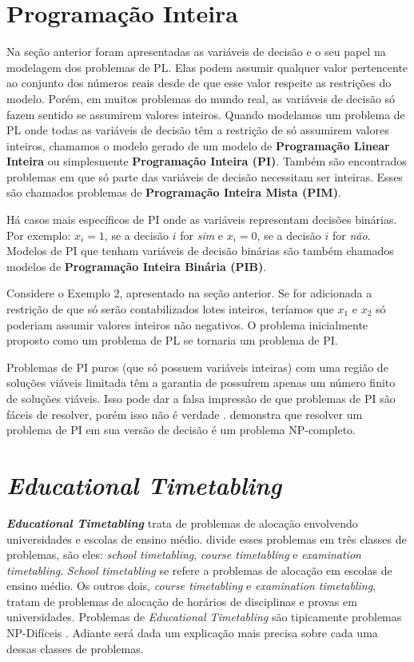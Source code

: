 \section{Programação Inteira}	

Na seção anterior foram apresentadas as variáveis de decisão e o seu papel na modelagem dos problemas de PL. Elas podem assumir qualquer valor pertencente ao conjunto dos números reais desde de que esse valor respeite as restrições do modelo. Porém, em muitos problemas do mundo real, as variáveis de decisão só fazem sentido se assumirem valores inteiros. Quando modelamos um problema de PL onde todas as variáveis de decisão têm a restrição de só assumirem valores inteiros, chamamos o modelo gerado de um modelo de \textbf{Programação Linear Inteira} ou simplesmente \textbf{Programação Inteira (PI)}. Também são encontrados problemas em que só parte das variáveis de decisão necessitam ser inteiras. Esses são chamados problemas de \textbf{Programação Inteira Mista (PIM)}. 

Há casos mais específicos de PI onde as variáveis representam decisões binárias. Por exemplo: $x_i = 1$, se a decisão $i$ for \textit{sim} e $x_i = 0$, se a decisão $i$ for \textit{não}. Modelos de PI que tenham variáveis de decisão binárias são também chamados modelos de \textbf{Programação Inteira Binária (PIB)}.

Considere o Exemplo 2, apresentado na seção anterior. Se for adicionada a restrição de que só serão contabilizados lotes inteiros, teríamos que $x_1$ e $x_2$ só poderiam assumir valores inteiros não negativos. O problema inicialmente proposto como um problema de PL se tornaria um problema de PI.

Problemas de PI puros (que só possuem variáveis inteiras) com uma região de soluções viáveis limitada têm a garantia de possuírem apenas um número finito de soluções viáveis. Isso pode dar a falsa impressão de que problemas de PI são fáceis de resolver, porém isso não é verdade \cite{hillier2010introduccao}.  demonstra que resolver um problema de PI em sua versão de decisão é um problema NP-completo.

\section{\textit{Educational Timetabling}}

\textbf{\textit{Educational Timetabling}} trata de problemas de alocação envolvendo universidades e escolas de ensino médio.  divide esses problemas em três classes de problemas, são eles: \textit{school timetabling}, \textit{course timetabling} e \textit{examination timetabling}. \textit{School timetabling} se refere a problemas de alocação em escolas de ensino médio. Os outros dois, \textit{course timetabling} e \textit{examination timetabling}, tratam de problemas de alocação de horários de disciplinas e provas em universidades. Problemas de \textit{Educational Timetabling} são tipicamente problemas NP-Difíceis \cite{Lewis2008}. Adiante será dada um explicação mais precisa sobre cada uma dessas classes de problemas.


